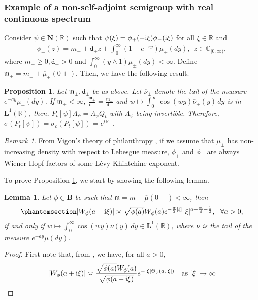 \documentclass[12pt]{amsart}
\newcommand{\hlabel}{\phantomsection\label}
\numberwithin{equation}{section}
\newcommand{\bb}{\mathbb}
\renewcommand{\ge}{\geqslant}
\newcommand{\ov}{\overline}
\newcommand{\ttt}{\mathtt}
\newcommand{\bmrm}[2][2]{\mathbf{#2}^{#1}}
\newcommand{\m}{\mathfrak{m}}
\newcommand{\B}{\mathbf{B}}
\newtheorem{prop}[thm]{Proposition}
\newtheorem{lem}[thm]{Lemma}
\theoremstyle{definition}
\theoremstyle{assump}
\theoremstyle{remark}
\newtheorem{rem}[thm]{Remark}
\begin{document}
{\subsubsection{Example of a non-self-adjoint semigroup with real continuous spectrum}\hlabel{sec:cont_spect_ex} Consider $\psi\in\mathbf{N}(\bb{R})$ such that $\psi(\xi)=\phi_+(-{\rm{i}}\xi   )\phi_-({\rm{i}}\xi   )$ for all $\xi\in \bb{R}$ and
\begin{align*}
\phi_{\pm}(z)=m_\pm+\ttt{d}_\pm z+\int_0^\infty (1-e^{-zy})\mu_\pm(dy), \ \  z\in\bb{C}_{[0,\infty)},
\end{align*}
where $m_\pm\ge 0, \ttt{d}_\pm> 0$ and $\int_0^\infty (y\wedge 1)\mu_\pm(dy)<\infty.$ Define $\m_\pm=m_\pm+\overline{\mu}_\pm(0+)$. Then, we have the following result.
\begin{prop}\hlabel{prop:cs}
Let $\m_\pm, \ttt d_\pm$ be as above. Let $\overline{\nu}_\pm$ denote the tail of the measure  $e^{-ay}\mu_\pm(dy)$. If $\m_\pm<\infty$, $\frac{\m_+}{\ttt{d}_+}=\frac{\m_-}{\ttt{d}_-}$ and $w\mapsto\int_0^\infty\cos(wy)\overline{\nu}_\pm(y)\,dy$ is in $\bmrm[1]{L}(\bb{R})$, then, $P_t[\psi]\Lambda_\psi=\Lambda_\psi Q_t$ with $\Lambda_\psi$ being invertible. Therefore, $\sigma(P_t[\psi])=\sigma_c(P_t[\psi])=e^{t\bb{R}_-}$.
\end{prop}
\begin{rem} From Vigon's theory of philanthropy \cite{vigon2002}, if we assume that $\mu_\pm$ has non-increasing density with respect to Lebesgue measure, $\phi_+$ and $\phi_-$ are always Wiener-Hopf factors of some L\'evy-Khintchine exponent.
\end{rem}
To prove Proposition \ref{prop:cs}, we start by showing  the following lemma.
\begin{lem}
Let $\phi\in\B$ be such that $\m=m+\ov{\mu}(0+)<\infty$, then
\begin{align}\hlabel{eq:w_phi_est}
|W_\phi(a+{\rm{i}}\xi)|\asymp\sqrt{\phi(a)} W_\phi(a)e^{-\frac{\pi}{2}|\xi|} |\xi|^{a+\frac{\m}{\ttt{d}}-\frac{1}{2}}, \ \ \forall a>0,
\end{align}
if and only if $w\mapsto\int_0^\infty\cos(wy)\overline{\nu}(y)\,dy \in \bmrm[1]{L}(\bb{R})$, where $\overline{\nu}$ is the tail of the measure $e^{-ay}\mu(dy)$.
\end{lem}
\begin{proof}
First note that, from  \cite[Theorem 6.2(1)]{patiesavov}, we have, for all $a>0$,
\begin{align*}
|W_{\phi}(a+{\rm{i}}\xi)   |\asymp\frac{\sqrt{\phi(a)}W_\phi(a)}{\sqrt{\phi(a+{\rm{i}}\xi)   }}e^{-|\xi|\Theta_\phi(a,|\xi|)} \ \ \ \mbox{as $|\xi|\to\infty$}

\end{align*}
\end{proof}}
\end{document}
